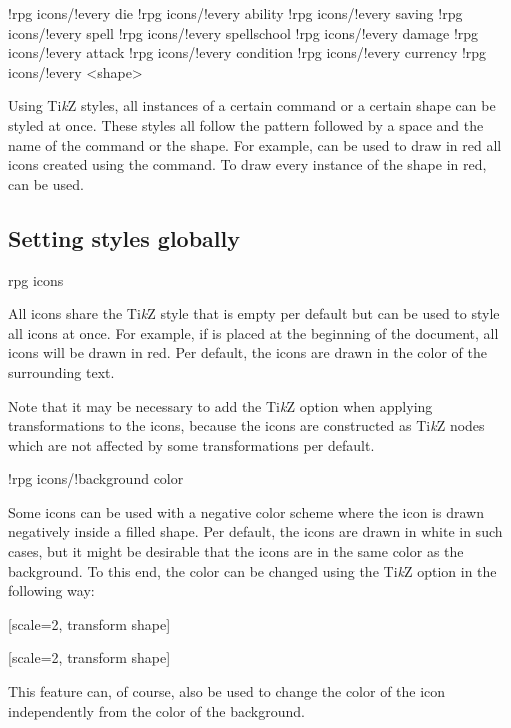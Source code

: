 \documentclass[a4paper]{article}
\begin{document}
\begin{macrodef}
!rpg icons/!every die
!rpg icons/!every ability
!rpg icons/!every saving
!rpg icons/!every spell
!rpg icons/!every spellschool
!rpg icons/!every damage
!rpg icons/!every attack
!rpg icons/!every condition
!rpg icons/!every currency
!rpg icons/!every <shape>
\end{macrodef}
Using Ti\emph{k}Z styles, all instances of a certain command or a certain shape can be styled at once. These styles all follow the pattern  followed by a space and the name of the command or the shape. For example,  can be used to draw in red all icons created using the \macro{\die} command. To draw every instance of the  shape in red,  can be used.

\subsection{Setting styles globally}

\begin{macrodef}rpg icons\end{macrodef}
All icons share the Ti\emph{k}Z style  that is empty per default but can be used to style all icons at once. For example, if  is placed at the beginning of the document, all icons will be drawn in red. Per default, the icons are drawn in the color of the surrounding text.

Note that it may be necessary to add the Ti\emph{k}Z option  when applying transformations to the icons, because the icons are constructed as Ti\emph{k}Z nodes which are not affected by some transformations per default.

\begin{macrodef}!rpg icons/!background color\end{macrodef}
Some icons can be used with a negative color scheme where the icon is drawn negatively inside a filled shape. Per default, the icons are drawn in white in such cases, but it might be desirable that the icons are in the same color as the background. To this end, the color can be changed using the Ti\emph{k}Z option  in the following way:

\begin{codeexample}
\colorbox{blue!50}{%
        [scale=2, transform shape]%
}

\colorbox{blue!50}{%
        [scale=2, transform shape]%
}
\end{codeexample}
This feature can, of course, also be used to change the color of the icon independently from the color of the background.
\end{document}

